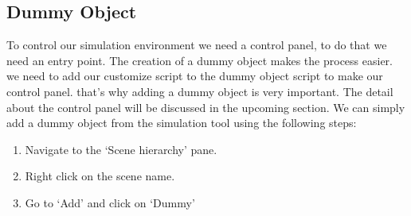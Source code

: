 \subsection{Dummy Object}
To control our simulation environment we need a control panel, to do that we need an entry point. The creation of a dummy object makes the process easier. we need to add our customize script to the dummy object script to make our control panel. that's why adding a dummy object is very important. The detail about the control panel will be discussed in the upcoming section.
We can simply add a dummy object from the simulation tool using the following steps: 

\begin{enumerate}
  \item  Navigate to the ‘Scene hierarchy’ pane.
  \item  Right click on the scene name.
  \item Go to ‘Add’ and click on ‘Dummy’
\end{enumerate}




